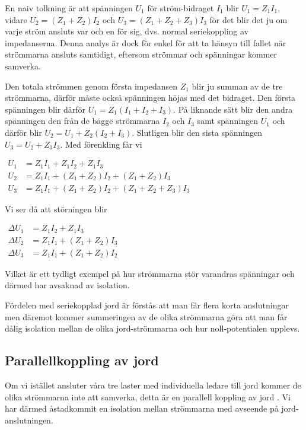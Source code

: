 En naiv tolkning är att spänningen \(U_1\) för ström-bidraget \(I_1\) blir
\(U_1 = Z_1 I_1\), vidare \(U_2 = (Z_1 + Z_2) I_2\) och
\(U_3 = (Z_1 + Z_2 + Z_3) I_3\) för det blir det ju om varje ström ansluts var
och en för sig, dvs. normal seriekoppling av impedanserna. Denna analys är
dock för enkel för att ta hänsyn till fallet när strömmarna ansluts samtidigt,
eftersom strömmar och spänningar kommer samverka.

Den totala strömmen genom första impedansen \(Z_1\) blir ju summan av de tre
strömmarna, därför måste också spänningen höjas med det bidraget. Den första
spänningen blir därför \(U_1=Z_1 (I_1 + I_2 + I_3)\). På liknande sätt blir
den andra spänningen den från de bägge strömmarna \(I_2\) och \(I_3\) samt
spänningen \(U_1\) och därför blir \(U_2 = U_1 + Z_2 (I_2 + I_3)\).
Slutligen blir den sista spänningen \(U_3 = U_2 + Z_3 I_3\). Med förenkling
får vi

\(
\begin{array}{ll}
U_1 & = Z_1 I_1 + Z_1 I_2 + Z_1 I_3 \\
U_2 & = Z_1 I_1 + (Z_1 + Z_2) I_2 + (Z_1 + Z_2) I_3 \\
U_3 & = Z_1 I_1 + (Z_1 + Z_2) I_2 + (Z_1 + Z_2 + Z_3) I_3
\end{array}
\)

Vi ser då att störningen blir

\(
\begin{array}{ll}
\Delta U_1 & =  Z_1 I_2 + Z_1 I_3 \\
\Delta U_2 & = Z_1 I_1 + (Z_1 + Z_2) I_3 \\
\Delta U_3 & = Z_1 I_1 + (Z_1 + Z_2) I_2
\end{array}
\)

Vilket är ett tydligt exempel på hur strömmarna stör varandras spänningar och därmed har avsaknad av isolation.

Fördelen med seriekopplad jord är förstås att man får flera korta anslutningar
men däremot kommer summeringen av de olika strömmarna göra att man får dålig
isolation mellan de olika jord-strömmarna och hur noll-potentialen upplevs.

\subsection{Parallellkoppling av jord}

Om vi istället ansluter våra tre laster med individuella ledare till jord
kommer de olika strömmarna inte att samverka, detta är en parallell koppling
av jord \cite[3]{ott1988}. Vi har därmed åstadkommit en isolation mellan
strömmarna med avseende på jord-anslutningen.

